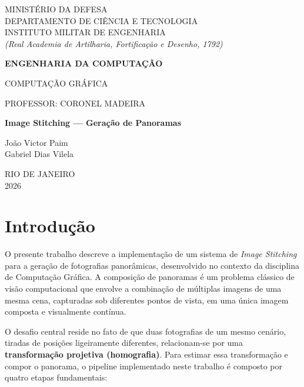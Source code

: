 \documentclass[12pt,a4paper]{article}
\begin{document}
\begin{titlepage}
\centering
\vspace*{1cm}

{\large MINISTÉRIO DA DEFESA\\
DEPARTAMENTO DE CIÊNCIA E TECNOLOGIA\\
INSTITUTO MILITAR DE ENGENHARIA\\[4pt]
\textit{(Real Academia de Artilharia, Fortificação e Desenho, 1792)}}

\vspace{1.5cm}
{\Large\bfseries ENGENHARIA DA COMPUTAÇÃO}

\vspace{0.5cm}
{\Large COMPUTAÇÃO GRÁFICA}

\vspace{0.5cm}
{\large PROFESSOR: CORONEL MADEIRA}

\vspace{3cm}
{\LARGE\bfseries Image Stitching --- Geração de Panoramas}

\vspace{3cm}
{\Large
João Victor Paim\\[6pt]
Gabriel Dias Vilela}

\vfill
{\large RIO DE JANEIRO\\2026}
\end{titlepage}

\newpage
\tableofcontents
\newpage

\section{Introdução}

O presente trabalho descreve a implementação de um sistema de \textit{Image Stitching}
para a geração de fotografias panorâmicas, desenvolvido no contexto da disciplina de
Computação Gráfica. A composição de panoramas é um problema clássico de visão
computacional que envolve a combinação de múltiplas imagens de uma mesma cena,
capturadas sob diferentes pontos de vista, em uma única imagem composta e
visualmente contínua.

O desafio central reside no fato de que duas fotografias de um mesmo cenário, tiradas
de posições ligeiramente diferentes, relacionam-se por uma \textbf{transformação
projetiva (homografia)}. Para estimar essa transformação e compor o panorama, o
pipeline implementado neste trabalho é composto por quatro etapas fundamentais:
\end{document}
